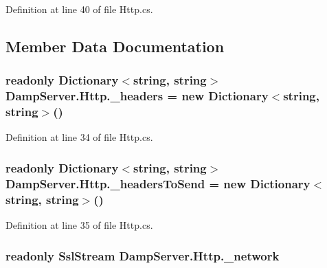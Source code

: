 Definition at line 40 of file Http.\-cs.



\subsection{Member Data Documentation}
\hypertarget{class_damp_server_1_1_http_a47b51d508ac52dd59858a1726b350ce5}{
\subsubsection[{\-\_\-headers}]{\setlength{\rightskip}{0pt plus 5cm}readonly Dictionary$<$string, string$>$ Damp\-Server.\-Http.\-\_\-headers = new Dictionary$<$string, string$>$()\hspace{0.3cm}{\ttfamily [private]}}}\label{class_damp_server_1_1_http_a47b51d508ac52dd59858a1726b350ce5}


Definition at line 34 of file Http.\-cs.

\hypertarget{class_damp_server_1_1_http_aee9d41f017dce1a5fd6b1f14ae6f547a}{
\subsubsection[{\-\_\-headers\-To\-Send}]{\setlength{\rightskip}{0pt plus 5cm}readonly Dictionary$<$string, string$>$ Damp\-Server.\-Http.\-\_\-headers\-To\-Send = new Dictionary$<$string, string$>$()\hspace{0.3cm}{\ttfamily [private]}}}\label{class_damp_server_1_1_http_aee9d41f017dce1a5fd6b1f14ae6f547a}


Definition at line 35 of file Http.\-cs.

\hypertarget{class_damp_server_1_1_http_a0aa570b59e1abbf1e2ac7efd5645fa50}{
\subsubsection[{\-\_\-network}]{\setlength{\rightskip}{0pt plus 5cm}readonly Ssl\-Stream Damp\-Server.\-Http.\-\_\-network\hspace{0.3cm}{\ttfamily [private]}}}\label{class_damp_server_1_1_http_a0aa570b59e1abbf1e2ac7efd5645fa50}


